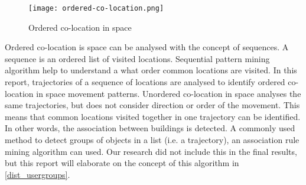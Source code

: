 \begin{figure}[H]
\centering
\texttt{[image: ordered-co-location.png]}
\captionsetup{justification=centering}
\caption{Ordered co-location in space}
\label{figure:colocation}
\end{figure}

Ordered co-location is space can be analysed with the concept of sequences. A sequence is an ordered list of visited locations. Sequential pattern mining algorithm help to understand a what order common locations are visited. In this report, trajectories of a sequence of locations are analysed to identify ordered co-location in space movement patterns.
Unordered co-location in space analyses the same trajectories, but does not consider direction or order of the movement. This means that common locations visited together in one trajectory can be identified. In other words, the association between buildings is detected. A commonly used method to detect groups of objects in a list (i.e. a trajectory), an association rule mining algorithm can used. Our research did not include this in the final results, but this report will elaborate on the concept of this algorithm in \autoref{dist_usergroups}.